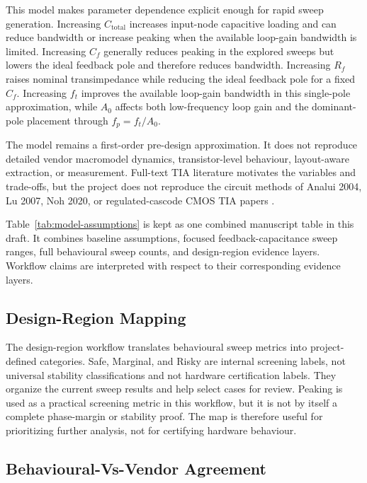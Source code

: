 This model makes parameter dependence explicit enough for rapid sweep generation. Increasing $C_{\mathrm{total}}$ increases input-node capacitive loading and can reduce bandwidth or increase peaking when the available loop-gain bandwidth is limited. Increasing $C_f$ generally reduces peaking in the explored sweeps but lowers the ideal feedback pole and therefore reduces bandwidth. Increasing $R_f$ raises nominal transimpedance while reducing the ideal feedback pole for a fixed $C_f$. Increasing $f_t$ improves the available loop-gain bandwidth in this single-pole approximation, while $A_0$ affects both low-frequency loop gain and the dominant-pole placement through $f_p=f_t/A_0$.

The model remains a first-order pre-design approximation. It does not reproduce detailed vendor macromodel dynamics, transistor-level behaviour, layout-aware extraction, or measurement. Full-text TIA literature motivates the variables and trade-offs, but the project does not reproduce the circuit methods of Analui 2004, Lu 2007, Noh 2020, or regulated-cascode CMOS TIA papers \citep{ANALUI_2004_BW_ENHANCEMENT,LU_2007_BROADBAND_TIA,NOH_2020_CF_TIA_DC_LOOP,PARK_YOO_2004_RGC_TIA}.

Table~\ref{tab:model-assumptions} is kept as one combined manuscript table in this draft. It combines baseline assumptions, focused feedback-capacitance sweep ranges, full behavioural sweep counts, and design-region evidence layers. Workflow claims are interpreted with respect to their corresponding evidence layers.

\subsection{Design-Region Mapping}

The design-region workflow translates behavioural sweep metrics into project-defined categories. Safe, Marginal, and Risky are internal screening labels, not universal stability classifications and not hardware certification labels. They organize the current sweep results and help select cases for review. Peaking is used as a practical screening metric in this workflow, but it is not by itself a complete phase-margin or stability proof. The map is therefore useful for prioritizing further analysis, not for certifying hardware behaviour.

\subsection{Behavioural-Vs-Vendor Agreement}

